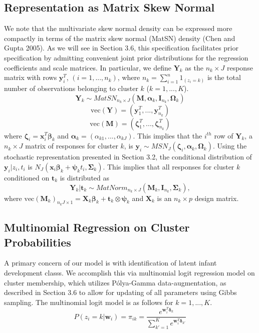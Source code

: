 \documentclass{article}
\begin{document}
\subsection{Representation as Matrix Skew Normal}

We note that the multivariate skew normal density can be expressed more compactly in terms of the matrix skew normal (MatSN) density (Chen and Gupta 2005). As we will see in Section 3.6, this specification facilitates prior specification by admitting convenient joint prior distributions for the regression coefficients and scale matrices. In particular, we define $\mathbf{Y}_k$ as the ${n_k \times J}$  response matrix with rows $\mathbf{y}_i^T$, $(i = 1,...,n_k)$, where $n_k = \sum_{i = 1}^n {1}_{(z_i = k)}$ is the total number of observations belonging to cluster $k$ ($k = 1,...,K$). 
$$\mathbf{Y}_{k} \sim MatSN_{n_k \times J}(\mathbf{M},\boldsymbol\alpha_k,\mathbf{I}_{n_k},\boldsymbol\Omega_k)$$
$$\text{vec}(\mathbf{Y}) =  (\mathbf{y}^T_1,...,\mathbf{y}^T_{n_k})$$
$$\text{vec}(\mathbf{M}) = (\boldsymbol\zeta_1^T,...,\boldsymbol\zeta_{n_k}^T)$$
where $\boldsymbol\zeta_i = \mathbf{x}_i^T \boldsymbol\beta_k$ and $\boldsymbol\alpha_k = (\alpha_{k1},...,\alpha_{kJ})$. This implies that the $i^{th}$ row of $\mathbf{Y}_k$, a ${n_k \times J}$ matrix of responses for cluster $k$, is $\mathbf{y}_i \sim MSN_J(\boldsymbol\zeta_i, \boldsymbol\alpha_k, \boldsymbol\Omega_k)$. Using the stochastic representation presented in Section 3.2, the conditional distribution of $\mathbf{y}_i | z_i, t_i$ is $N_J (\mathbf{x}_i \boldsymbol\beta_k + \boldsymbol\psi_k t_i,\boldsymbol\Sigma_k)$. This implies that all responses for cluster $k$ conditioned on $\mathbf{t}_{k}$ is distributed as 
$$\mathbf{Y}_k | \mathbf{t}_k \sim MatNorm_{n_k \times J}(\mathbf{M}_k, \mathbf{I}_{n_k}, \boldsymbol\Sigma_k),$$
where $\text{vec}(\mathbf{M}_k)_{n_kJ \times 1} = \mathbf{X}_{k} \boldsymbol\beta_k + \mathbf{t}_k \otimes \boldsymbol\psi_k$ and $\mathbf{X}_k$ is an $n_k \times p$ design matrix.

\subsection{Multinomial Regression on Cluster Probabilities}

A primary concern of our model is with identification of latent infant development classs. We accomplish this via multinomial logit regression model on cluster membership, which utilizes P\'{o}lya-Gamma data-augmentation, as described in Section 3.6 to allow for updating of all parameters using Gibbs sampling. The multinomial logit model is as follows for $k = 1,...,K$.
$$P(z_i = k|\mathbf{w}_i) = \pi_{ik} = \frac{e^{\mathbf{w}_i^T \boldsymbol\delta_k}}{\sum_{k' = 1}^K e^{\mathbf{w}_i^T \boldsymbol\delta_{k'}}}$$
\end{document}
